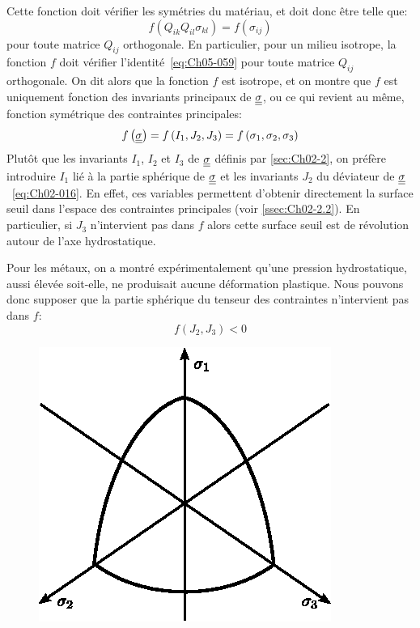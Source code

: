 Cette fonction doit vérifier les symétries du matériau, et doit donc être telle que: 
\begin{equation}
    f \left( Q_{ik} Q_{il} \sigma_{kl} \right) = f \left( \sigma_{ij} \right)
    \label{eq:Ch05-059}
\end{equation}
pour toute matrice $Q_{ij}$ orthogonale.
En particulier, pour un milieu isotrope, la fonction $f$ doit vérifier l'identité~\eqref{eq:Ch05-059} pour toute matrice $Q_{ij}$ orthogonale.
On dit alors que la fonction $f$ est isotrope, et on montre que $f$ est uniquement fonction des invariants principaux de $\underline{\underline{\sigma}}$, ou ce qui revient au même, fonction symétrique des contraintes principales: 
\begin{equation}
    f\left( \underline{\underline{\sigma}} \right) = f \left( I_1, J_2, J_3 \right) = f\left( \sigma_1, \sigma_2, \sigma_3 \right)
    \label{eq:Ch05-060}
\end{equation}
Plutôt que les invariants $I_1$, $I_2$ et $I_3$ de $\underline{\underline{\sigma}}$ définis par \ref{sec:Ch02-2}, on préfère introduire $I_1$ lié à la partie sphérique de $\underline{\underline{\sigma}}$ et les invariants $J_2$ du déviateur de $\underline{\underline{\sigma}}$~\eqref{eq:Ch02-016}.
En effet, ces variables permettent d'obtenir directement la surface seuil dans l'espace des contraintes principales (voir \ref{ssec:Ch02-2.2}).
En particulier, si $J_3$ n'intervient pas dans $f$ alors cette surface seuil est de révolution autour de l'axe hydrostatique.

Pour les métaux, on a montré expérimentalement qu'une pression hydrostatique, aussi élevée soit-elle, ne produisait aucune déformation plastique.
Nous pouvons donc supposer que la partie sphérique du tenseur des contraintes n'intervient pas dans $f$:
\begin{equation}
    f \left( J_2, J_3 \right) < 0
    \label{eq:Ch05-061}
\end{equation}

\begin{figure}
    \begin{center}
        \includegraphics{../images/T1_Ch05-02}
    \end{center}
\end{figure}


